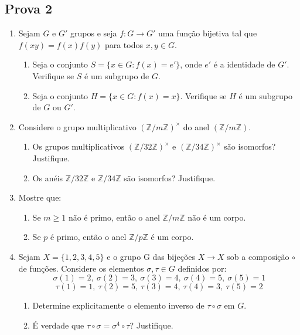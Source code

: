 \subsection{Prova 2}

\begin{enumerate}[left=0.5cm, align=left, nosep]
    \item Sejam $G$ e $G'$ grupos e seja $f: G \to G'$ uma função bijetiva tal que $f(xy) = f(x)f(y)$ para todos $x, y \in G$.
    \begin{enumerate}[label=\alph*), left=0.5cm, align=left, nosep]
        \item Seja o conjunto $S = \{ x \in G : f(x) = e' \}$, onde $e'$ é a identidade de $G'$. Verifique se $S$ é um subgrupo de $G$.
        \item Seja o conjunto $H = \{ x \in G : f(x) = x \}$. Verifique se $H$ é um subgrupo de $G$ ou $G'$.
    \end{enumerate}

    \item Considere o grupo multiplicativo $(\mathbb{Z}/m\mathbb{Z})^{\times}$ do anel $(\mathbb{Z}/m\mathbb{Z})$.
    
    \begin{enumerate}[label=\alph*), left=0.5cm, align=left, nosep]
        \item Os grupos multiplicativos $(\mathbb{Z}/32\mathbb{Z})^\times$ e $(\mathbb{Z}/34\mathbb{Z})^\times$ são isomorfos? Justifique.
        \item Os anéis $\mathbb{Z}/32\mathbb{Z}$ e $\mathbb{Z}/34\mathbb{Z}$ são isomorfos? Justifique.
    \end{enumerate}

    \item Mostre que:
    \begin{enumerate}[label=\alph*), left=0.5cm, align=left, nosep]
        \item Se $m \geq 1$ não é primo, então o anel $\mathbb{Z}/m\mathbb{Z}$ não é um corpo.
        \item Se $p$ é primo, então o anel $\mathbb{Z}/p\mathbb{Z}$ é um corpo.
    \end{enumerate}

    \item Sejam $X = \{1, 2, 3, 4, 5\}$ e o grupo G das bijeções $X \rightarrow X$ sob a composição $\circ$ de funções. Considere 
    os elementos $\sigma, \tau \in G$ definidos por: 
    \[ \sigma(1) = 2,\ \sigma(2) = 3,\ \sigma(3) = 4,\ \sigma(4) = 5,\ \sigma(5) = 1 \] 
    \[ \tau(1) = 1,\ \tau(2) = 5,\ \tau(3) = 4,\ \tau(4) = 3,\ \tau(5) = 2 \] 
    \begin{enumerate}[label=\alph*), left=0.5cm, align=left, nosep] 
        \item Determine explicitamente o elemento inverso de $\tau \circ \sigma$ em $G$. 
        \item É verdade que $\tau \circ \sigma = \sigma^4 \circ \tau$? Justifique.
    \end{enumerate}
\end{enumerate}

